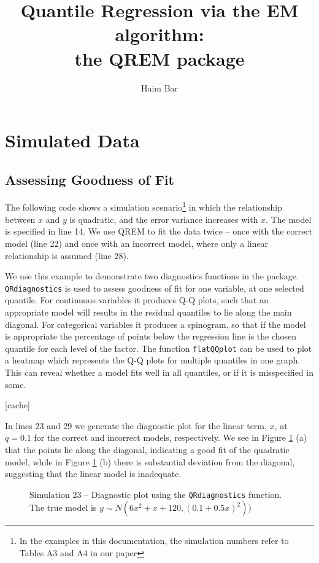 \documentclass[a4paper,10pt]{article}
\title{Quantile Regression via the EM algorithm: \\the QREM package}
\author{Haim Bar}
\begin{document}
\maketitle

\section{Simulated Data}
\subsection{Assessing Goodness of Fit}
The following code shows a simulation scenario\footnote{In the examples in this documentation, the simulation numbers refer to Tables A3 and A4 in our paper} in which the relationship between $x$ and $y$ is quadratic, and the error variance increases with $x$. The model is specified in line 14.
We use QREM to fit the data twice -- once with the correct model (line 22) and once with an incorrect model, where only a linear relationship is assumed (line 28).
 

We use this example to demonstrate two diagnostics functions in the package. \texttt{QRdiagnostics} is used to assess goodness of fit for one variable, at one selected quantile. For continuous variables it produces Q-Q plots, such that an appropriate model will results in the residual quantiles to lie along the main diagonal. For categorical variables it produces a spinogram, so that if the model is appropriate the percentage of points below the regression line is the chosen quantile for each level of the factor.
The function \texttt{flatQQplot} can be used to plot a heatmap which represents the Q-Q plots for multiple quantiles in one graph. This can reveal whether a model fits well in all quantiles, or if it is misspecified in some.

[cache]

In lines 23 and 29 we generate the diagnostic plot for the linear term, $x$, at $q=0.1$ for the correct and incorrect models, respectively. We see in Figure \ref{sim23} (a) that the points lie along the diagonal, indicating a good fit of the quadratic model, while in Figure \ref{sim23} (b) there is substantial deviation from the diagonal, suggesting that the linear model is inadequate.

\begin{figure}
\centering
{}
\caption{Simulation 23 -- Diagnostic plot using the \texttt{QRdiagnostics} function. The true model is $y \sim N(6x^2 + x +120, (0.1+0.5x)^2))$}\label{sim23}
\end{figure}
\end{document}
